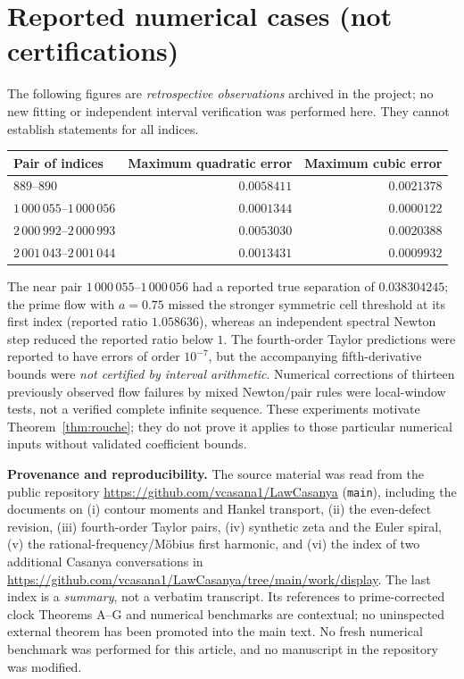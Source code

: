 \documentclass[11pt,a4paper]{article}
\numberwithin{equation}{section}
\begin{document}
\section{Reported numerical cases (not certifications)}
The following figures are \emph{retrospective observations} archived in the project; no new fitting or independent interval verification was performed here. They cannot establish statements for all indices.
\begin{center}\small
\begin{tabular}{@{}lrr@{}}\toprule
Pair of indices & Maximum quadratic error & Maximum cubic error\\\midrule
$889$--$890$ & $0.0058411$ & $0.0021378$\\
$1\,000\,055$--$1\,000\,056$ & $0.0001344$ & $0.0000122$\\
$2\,000\,992$--$2\,000\,993$ & $0.0053030$ & $0.0020388$\\
$2\,001\,043$--$2\,001\,044$ & $0.0013431$ & $0.0009932$\\\bottomrule
\end{tabular}
\end{center}
The near pair $1\,000\,055$--$1\,000\,056$ had a reported true separation of $0.038304245$; the prime flow with $a=0.75$ missed the stronger symmetric cell threshold at its first index (reported ratio $1.058636$), whereas an independent spectral Newton step reduced the reported ratio below $1$. The fourth-order Taylor predictions were reported to have errors of order $10^{-7}$, but the accompanying fifth-derivative bounds were \emph{not certified by interval arithmetic}. Numerical corrections of thirteen previously observed flow failures by mixed Newton/pair rules were local-window tests, not a verified complete infinite sequence. These experiments motivate Theorem~\ref{thm:rouche}; they do not prove it applies to those particular numerical inputs without validated coefficient bounds.

\smallskip\noindent\textbf{Provenance and reproducibility.}
The source material was read from the public repository
\url{https://github.com/vcasana1/LawCasanya} (\texttt{main}), including the documents on (i) contour moments and Hankel transport, (ii) the even-defect revision, (iii) fourth-order Taylor pairs, (iv) synthetic zeta and the Euler spiral, (v) the rational-frequency/M\"obius first harmonic, and (vi) the index of two additional Casanya conversations in \url{https://github.com/vcasana1/LawCasanya/tree/main/work/display}.
The last index is a \emph{summary}, not a verbatim transcript. Its references to prime-corrected clock Theorems A--G and numerical benchmarks are contextual; no uninspected external theorem has been promoted into the main text. No fresh numerical benchmark was performed for this article, and no manuscript in the repository was modified.
\end{document}
